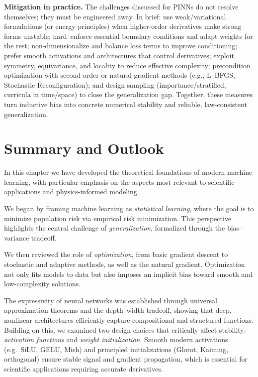 \medskip
\noindent\textbf{Mitigation in practice.}
The challenges discussed for PINNs do not resolve themselves; they must be engineered away. 
In brief: use weak/variational formulations (or energy principles) when higher-order derivatives make strong forms unstable; 
hard–enforce essential boundary conditions and adapt weights for the rest; 
non-dimensionalize and balance loss terms to improve conditioning; 
prefer smooth activations and architectures that control derivatives; 
exploit symmetry, equivariance, and locality to reduce effective complexity; 
precondition optimization with second-order or natural-gradient methods (e.g., L\,-BFGS, Stochastic Reconfiguration); 
and design sampling (importance/stratified, curricula in time/space) to close the generalization gap. 
Together, these measures turn inductive bias into concrete numerical stability and reliable, law-consistent generalization.

\section{Summary and Outlook}
\label{sec:ml_summary}

In this chapter we have developed the theoretical foundations of modern 
machine learning, with particular emphasis on the aspects most relevant 
to scientific applications and physics-informed modeling.  

We began by framing machine learning as \emph{statistical learning}, 
where the goal is to minimize population risk via empirical risk minimization. 
This perspective highlights the central challenge of \emph{generalization}, 
formalized through the bias--variance tradeoff.  

We then reviewed the role of \emph{optimization}, from basic gradient descent 
to stochastic and adaptive methods, as well as the natural gradient. 
Optimization not only fits models to data but also imposes an implicit bias 
toward smooth and low-complexity solutions.  

The expressivity of neural networks was established through universal 
approximation theorems and the depth--width tradeoff, showing that deep, 
nonlinear architectures efficiently capture compositional and structured 
functions. Building on this, we examined two design choices that critically 
affect stability: \emph{activation functions} and \emph{weight initialization}. 
Smooth modern activations (e.g.\ SiLU, GELU, Mish) and principled 
initializations (Glorot, Kaiming, orthogonal) ensure stable signal and 
gradient propagation, which is essential for scientific applications 
requiring accurate derivatives.  

